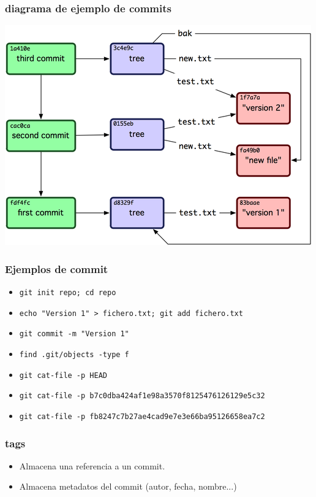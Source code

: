 \documentclass[10pt]{beamer}
\begin{document}
  \begin{frame}[containsverbatim]
    \frametitle{diagrama de ejemplo de commits}
    \begin{center}\includegraphics{commits.png}\end{center}
  \end{frame}

  \begin{frame}[containsverbatim]
    \frametitle{Ejemplos de commit}
    \begin{itemize}
        \item \verb$git init repo; cd repo$
        \item \verb$echo "Version 1" > fichero.txt; git add fichero.txt$
        \item \verb$git commit -m "Version 1"$
        \item \verb$find .git/objects -type f$
        \item \verb$git cat-file -p HEAD$
        \item \verb$git cat-file -p b7c0dba424af1e98a3570f8125476126129e5c32$
        \item \verb$git cat-file -p fb8247c7b27ae4cad9e7e3e66ba95126658ea7c2$
    \end{itemize}
  \end{frame}

  \begin{frame}[containsverbatim]
    \frametitle{tags}
    \begin{itemize}
        \item Almacena una referencia a un commit.
        \item Almacena metadatos del commit (autor, fecha, nombre...)
    \end{itemize}
  \end{frame}
\end{document}
